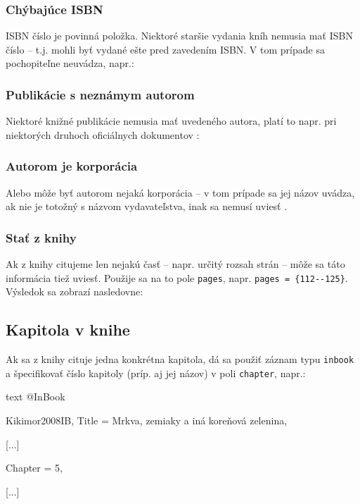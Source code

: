 \noindent[X] 

\subsubsection{Chýbajúce ISBN}

ISBN číslo je povinná položka. Niektoré staršie vydania kníh nemusia mať ISBN číslo -- t.j. mohli byť vydané ešte pred zavedením ISBN. V tom prípade sa pochopiteľne neuvádza, napr.:

\noindent[X] 

\subsubsection{Publikácie s neznámym autorom}

Niektoré knižné publikácie nemusia mať uvedeného autora, platí to napr. pri niektorých druhoch oficiálnych dokumentov \cite{boldis1}:

\noindent[X] 

\subsubsection{Autorom je korporácia}

Alebo môže byť autorom nejaká korporácia -- v tom prípade sa jej názov uvádza, ak nie je totožný s názvom vydavateľstva, inak sa nemusí uviesť \cite{boldis1}.

\subsubsection{Stať z knihy}

Ak z knihy citujeme len nejakú časť -- napr. určitý rozsah strán -- môže sa táto informácia tiež uviesť. Použije sa na to pole \texttt{pages}, napr. \texttt{pages = \{112{-}{-}125\}}. Výsledok sa zobrazí nasledovne:

\noindent[X] 

\subsection{Kapitola v knihe}

Ak sa z knihy cituje jedna konkrétna kapitola, dá sa použiť záznam typu \texttt{inbook} a špecifikovať číslo kapitoly (príp. aj jej názov) v poli \texttt{chapter}, napr.:
\begin{inlinecode}[breaklines]{text}
@InBook{Kikimor2008IB,
  Title                    = {Mrkva, zemiaky a iná koreňová zelenina},
  
  [...]
  
  Chapter                  = {5},
  
  [...]
  
}
\end{inlinecode}

